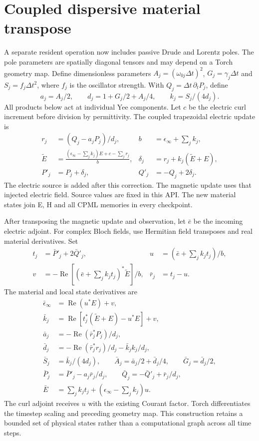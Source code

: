 \documentclass[11pt,a4paper]{article}
\begin{document}
\section{Coupled dispersive material transpose}
A separate resident operation now includes passive Drude and Lorentz poles.
The pole parameters are spatially diagonal tensors and may depend on a
Torch geometry map. Define dimensionless parameters $A_j=(\omega_{0j}\Delta t)^2$,
$G_j=\gamma_j\Delta t$ and $S_j=f_j\Delta t^2$, where $f_j$ is the oscillator
strength. With $Q_j=\Delta t\,\partial_t P_j$, define
\begin{equation}
 a_j=A_j/2,\qquad d_j=1+G_j/2+A_j/4,\qquad k_j=S_j/(4d_j).
\end{equation}
All products below act at individual Yee components. Let $c$ be the
electric curl increment before division by permittivity. The coupled
trapezoidal electric update is
\begin{align}
 r_j&=(Q_j-a_jP_j)/d_j, & b&=\epsilon_\infty+\sum_j k_j,\\
 \widetilde E&=\frac{(\epsilon_\infty-\sum_j k_j)E+c-\sum_j r_j}{b}, &
 \delta_j&=r_j+k_j(\widetilde E+E),\\
 P'_j&=P_j+\delta_j, & Q'_j&=-Q_j+2\delta_j.
\end{align}
The electric source is added after this correction. The magnetic update
uses that injected electric field. Source values are fixed in this API.
The new material states join E, H and all CPML memories in every checkpoint.

After transposing the magnetic update and observation, let $\bar e$ be the
incoming electric adjoint. For complex Bloch fields, use Hermitian field
transposes and real material derivatives. Set
\begin{align}
 t_j&=\bar P'_j+2\bar Q'_j, &
 u&=(\bar e+\sum_j k_jt_j)/b,\\
 v&=-\operatorname{Re}[(\bar e+\sum_j k_jt_j)^*\widetilde E]/b, &
 \bar r_j&=t_j-u.
\end{align}
The material and local state derivatives are
\begin{align}
 \bar\epsilon_\infty&=\operatorname{Re}(u^*E)+v,\\
 \bar k_j&=\operatorname{Re}[t_j^*(\widetilde E+E)-u^*E]+v,\\
 \bar a_j&=-\operatorname{Re}(\bar r_j^*P_j)/d_j,\\
 \bar d_j&=-\operatorname{Re}(\bar r_j^*r_j)/d_j-\bar k_j k_j/d_j,\\
 \bar S_j&=\bar k_j/(4d_j),\qquad
 \bar A_j=\bar a_j/2+\bar d_j/4,\qquad \bar G_j=\bar d_j/2,\\
 \bar P_j&=\bar P'_j-a_j\bar r_j/d_j,\qquad
 \bar Q_j=-\bar Q'_j+\bar r_j/d_j,\\
 \bar E&=\sum_j k_jt_j+(\epsilon_\infty-\sum_j k_j)u.
\end{align}
The curl adjoint receives $u$ with the existing Courant factor. Torch
differentiates the timestep scaling and preceding geometry map. This
construction retains a bounded set of physical states rather than a
computational graph across all time steps.
\end{document}
